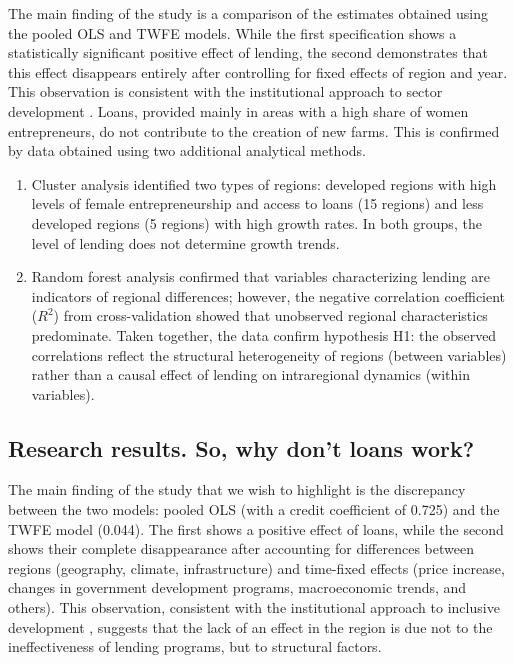 ﻿\documentclass[pdflatex,sn-mathphys-ay]{sn-jnl}
\begin{document}
The main finding of the study is a comparison of the estimates obtained
using the pooled OLS and TWFE models. While the first specification
shows a statistically significant positive effect of lending, the second
demonstrates that this effect disappears entirely after controlling for
fixed effects of region and year. This observation is consistent with
the institutional approach to sector development \citep{ref78,ref90}. Loans, provided mainly in areas with a
high share of women entrepreneurs, do not contribute to the creation of
new farms. This is confirmed by data obtained using two additional
analytical methods.

\begin{enumerate}
\item Cluster analysis identified two types of regions: developed
regions with high levels of female entrepreneurship and access to loans
(15 regions) and less developed regions (5 regions) with high growth
rates. In both groups, the level of lending does not determine growth
trends.

\item Random forest analysis confirmed that variables characterizing
lending are indicators of regional differences; however, the negative
correlation coefficient ($R^2$) from cross-validation showed that
unobserved regional characteristics predominate. Taken together, the
data confirm hypothesis H1: the observed correlations reflect the
structural heterogeneity of regions (between variables) rather than a
causal effect of lending on intraregional dynamics (within variables).
\end{enumerate}

\subsection{Research results. So, why don't loans work?}

The main finding of the study that we wish to highlight is the
discrepancy between the two models: pooled OLS (with a credit
coefficient of 0.725) and the TWFE model (0.044). The first shows a
positive effect of loans, while the second shows their complete
disappearance after accounting for differences between regions
(geography, climate, infrastructure) and time-fixed effects (price
increase, changes in government development programs, macroeconomic
trends, and others). This observation, consistent with the institutional
approach to inclusive development \citep{ref78,ref90}, suggests that the lack of an effect in the
region is due not to the ineffectiveness of lending programs, but to
structural factors.
\end{document}

